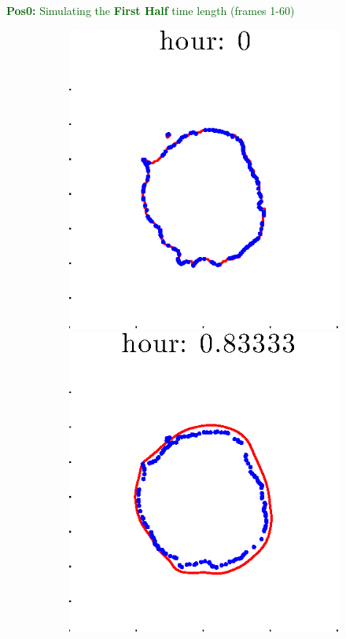 \documentclass[12pt]{article}
\begin{document}
\clearpage

\noindent \textcolor{DarkGreen}{\textbf{Pos0:} Simulating the \textbf{First Half} time length (frames 1-60)}

\begin{figure}[h!]
\centering
	\begin{subfigure}[b]{.3\textwidth}
	\centering
		\includegraphics[height=.15\textheight]{Pos0/firsthalf/full1.eps}
		\includegraphics[height=.15\textheight]{Pos0/firsthalf/full2.eps}

\end{subfigure}
\end{figure}
\end{document}
